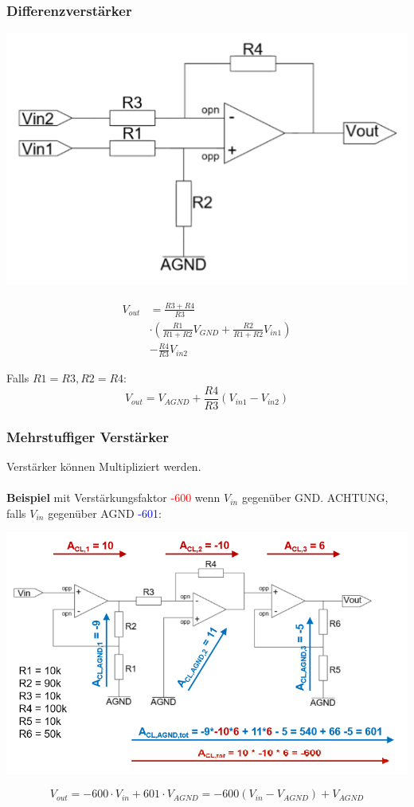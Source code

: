 \subsubsection{Differenzverstärker}
\begin{minipage}{0.20\textwidth}
	\includegraphics[width=\linewidth,keepaspectratio=true]{./Images/opamp_differenz}
\end{minipage}%
\begin{minipage}{0.30\textwidth}
	\begin{align*}
		V_{out} &= \frac{R3 +  R4}{R3} \\ &\cdot \left(\frac{R1}{R1 + R2}V_{GND} + \frac{R2}{R1 + R2}V_{in1}\right) \\ &- \frac{R4}{R3}V_{in2}
	\end{align*}
\end{minipage}

Falls $R1=R3, R2=R4$: \[ V_{out} = V_{AGND}+ \frac{R4}{R3}(V_{in1} - V_{in2}) \]
 
\subsubsection{Mehrstuffiger Verstärker}
Verstärker können Multipliziert werden. \\
~\\\textbf{Beispiel }mit Verstärkungsfaktor \textcolor{red}{-600} wenn $V_{in}$ gegenüber GND. ACHTUNG, falls $V_{in}$ gegenüber AGND \textcolor{blue}{-601}:\\
\begin{center}
	\includegraphics[width=0.8\linewidth]{Images/opamp_mehrstufig}
\end{center}
\[
V_{out} = -600\cdot V_{in} + 601\cdot V_{AGND} = -600(V_{in} - V_{AGND}) + V_{AGND}
\]

